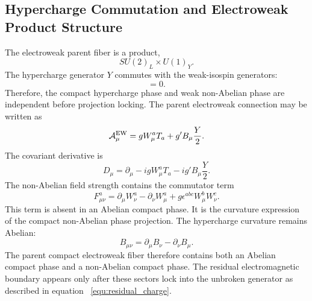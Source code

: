 \documentclass[11pt]{article}
\begin{document}
\subsection{Hypercharge Commutation and Electroweak Product Structure}
\label{sec:pr2_hypercharge_commutation}

The electroweak parent fiber is a product,
\begin{equation}
SU(2)_L\times U(1)_Y.
\end{equation}
The hypercharge generator \(Y\) commutes with the weak-isospin generators:
\begin{equation}
[Y,T_a]=0.
\end{equation}
Therefore, the compact hypercharge phase and weak non-Abelian phase are independent before projection locking. The parent electroweak connection may be written as
\begin{equation}
\label{equ:electroweak}
\mathcal A_\mu^{\rm EW}
=
gW_\mu^aT_a
+
g'B_\mu\frac{Y}{2}.
\end{equation}
The covariant derivative is
\begin{equation}
\label{equ:electroweak_covariant}
D_\mu
=
\partial_\mu
-
igW_\mu^aT_a
-
ig'B_\mu\frac{Y}{2}.
\end{equation}
The non-Abelian field strength contains the commutator term
\begin{equation}
F_{\mu\nu}^{a}
=
\partial_\mu W_\nu^a
-
\partial_\nu W_\mu^a
+
g\epsilon^{abc}W_\mu^bW_\nu^c.
\end{equation}
This term is absent in an Abelian compact phase. 
It is the curvature expression of the compact non-Abelian phase projection. The hypercharge curvature remains Abelian:
\begin{equation}
B_{\mu\nu}
=
\partial_\mu B_\nu
-
\partial_\nu B_\mu.
\end{equation}
The parent compact electroweak fiber therefore contains both an Abelian compact phase and a non-Abelian compact phase. The residual electromagnetic boundary appears only after these sectors lock into the unbroken generator as described in equation ~\ref{equ:residual_charge}.
\end{document}
